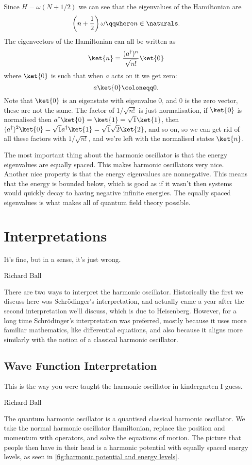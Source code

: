 \documentclass[fleqn]{NotesClass}
\newcommand{\hermit}{{\dagger}}
\begin{document}
    Since \(H = \omega(N + 1/2)\) we can see that the eigenvalues of the Hamiltonian are
    \begin{equation}
        \left( n + \frac{1}{2} \right)\omega \qqwhere n \in \naturals.
    \end{equation}
    The eigenvectors of the Hamiltonian can all be written as
    \begin{equation}
        \ket{n} = \frac{(a^\hermit)^n}{\sqrt{n!}} \ket{0}
    \end{equation}
    where \(\ket{0}\) is such that when \(a\) acts on it we get zero:
    \begin{equation}
        a\ket{0} \coloneqq 0.
    \end{equation}
    Note that \(\ket{0}\) is an eigenstate with eigenvalue 0, and \(0\) is the zero vector, these are not the same.
    The factor of \(1/\sqrt{n!}\) is just normalisation, if \(\ket{0}\) is normalised then \(a^\hermit \ket{0} = \ket{1} = \sqrt{1}\ket{1}\), then \((a^\hermit)^2\ket{0} = \sqrt{1}a^\hermit \ket{1} = \sqrt{1} \sqrt{2} \ket{2}\), and so on, so we can get rid of all these factors with \(1/\sqrt{n!}\), and we're left with the normalised states \(\ket{n}\).
    
    The most important thing about the harmonic oscillator is that the energy eigenvalues are equally spaced.
    This makes harmonic oscillators very nice.
    Another nice property is that the energy eigenvalues are nonnegative.
    This means that the energy is bounded below, which is good as if it wasn't then systems would quickly decay to having negative infinite energies.
    The equally spaced eigenvalues is what makes all of quantum field theory possible.
    
    \section{Interpretations}
    \epigraph{It's fine, but in a sense, it's just wrong.}{Richard Ball}
    There are two ways to interpret the harmonic oscillator.
    Historically the first we discuss here was Schrödinger's interpretation, and actually came a year after the second interpretation we'll discuss, which is due to Heisenberg.
    However, for a long time Schrödinger's interpretation was preferred, mostly because it uses more familiar mathematics, like differential equations, and also because it aligns more similarly with the notion of a classical harmonic oscillator.
    
    \subsection{Wave Function Interpretation}
    \epigraph{This is the way you were taught the harmonic oscillator in kindergarten I guess.}{Richard Ball}
    The quantum harmonic oscillator is a quantised classical harmonic oscillator.
    We take the normal harmonic oscillator Hamiltonian, replace the position and momentum with operators, and solve the equations of motion.
    The picture that people then have in their head is a harmonic potential with equally spaced energy levels, as seen in \cref{fig:harmonic potential and energy levels}.
    
\end{document}
